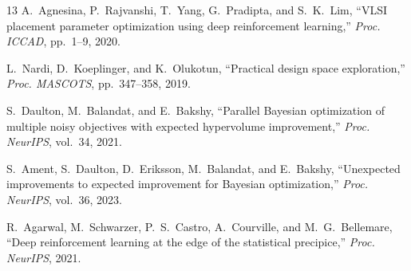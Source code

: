 \documentclass[conference]{IEEEtran}
\begin{document}
\begin{thebibliography}{13}
A.~Agnesina, P.~Rajvanshi, T.~Yang, G.~Pradipta, and S.~K.~Lim,
``VLSI placement parameter optimization using deep reinforcement learning,''
\textit{Proc. ICCAD}, pp.~1--9, 2020.

L.~Nardi, D.~Koeplinger, and K.~Olukotun,
``Practical design space exploration,''
\textit{Proc. MASCOTS}, pp.~347--358, 2019.

S.~Daulton, M.~Balandat, and E.~Bakshy,
``Parallel Bayesian optimization of multiple noisy objectives with expected
hypervolume improvement,''
\textit{Proc. NeurIPS}, vol.~34, 2021.

S.~Ament, S.~Daulton, D.~Eriksson, M.~Balandat, and E.~Bakshy,
``Unexpected improvements to expected improvement for Bayesian optimization,''
\textit{Proc. NeurIPS}, vol.~36, 2023.

R.~Agarwal, M.~Schwarzer, P.~S.~Castro, A.~Courville, and M.~G.~Bellemare,
``Deep reinforcement learning at the edge of the statistical precipice,''
\textit{Proc. NeurIPS}, 2021.

\end{thebibliography}

\balance
\end{document}
